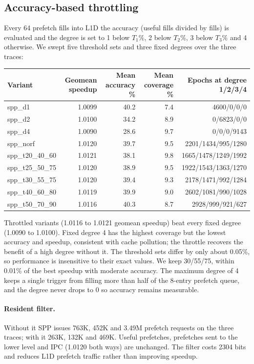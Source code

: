 \subsection{Accuracy-based throttling}
Every 64 prefetch fills into L1D the accuracy (useful fills divided by fills) is evaluated and the degree is set to 1 below $T_1$\%, 2 below $T_2$\%, 3 below $T_3$\% and 4 otherwise.
We swept five threshold sets and three fixed degrees over the three traces:
\begin{center}
\small
\begin{tabular}{lrrrr}
\toprule
Variant & Geomean speedup & Mean accuracy \% & Mean coverage \% & Epochs at degree 1/2/3/4 \\
\midrule
spp\_d1 & 1.0099 & 40.2 & 7.4 & 4600/0/0/0 \\
spp\_d2 & 1.0100 & 34.2 & 8.9 & 0/6823/0/0 \\
spp\_d4 & 1.0090 & 28.6 & 9.7 & 0/0/0/9143 \\
spp\_norf & 1.0120 & 39.7 & 9.5 & 2201/1434/995/1280 \\
spp\_t20\_40\_60 & 1.0121 & 38.1 & 9.8 & 1665/1478/1249/1992 \\
spp\_t25\_50\_75 & 1.0120 & 38.9 & 9.5 & 1922/1543/1363/1270 \\
spp\_t30\_55\_75 & 1.0120 & 39.4 & 9.3 & 2178/1471/992/1284 \\
spp\_t40\_60\_80 & 1.0119 & 39.9 & 9.0 & 2602/1081/990/1028 \\
spp\_t50\_70\_90 & 1.0116 & 40.3 & 8.7 & 2928/999/921/627 \\
\bottomrule
\end{tabular}
\end{center}
Throttled variants (1.0116 to 1.0121 geomean speedup) beat every fixed degree (1.0090 to 1.0100).
Fixed degree 4 has the highest coverage but the lowest accuracy and speedup, consistent with cache pollution; the throttle recovers the benefit of a high degree without it.
The threshold sets differ by only about 0.05\%, so performance is insensitive to their exact values.
We keep 30/55/75, within 0.01\% of the best speedup with moderate accuracy.
The maximum degree of 4 keeps a single trigger from filling more than half of the 8-entry prefetch queue, and the degree never drops to 0 so accuracy remains measurable.

\paragraph{Resident filter.}
Without it SPP issues 763K, 452K and 3.49M prefetch requests on the three traces; with it 263K, 132K and 469K.
Useful prefetches, prefetches sent to the lower level and IPC (1.0120 both ways) are unchanged.
The filter costs 2304 bits and reduces L1D prefetch traffic rather than improving speedup.

